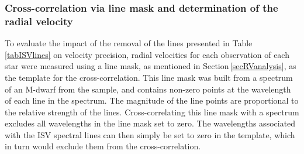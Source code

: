 \subsubsection{Cross-correlation via line mask and determination of the radial velocity}
To evaluate the impact of the removal of the lines presented in Table\,\ref{tabISVlines} on velocity precision, radial velocities for each observation of each star were measured using a line mask, as mentioned in Section\,\ref{secRVanalysis}, as the template for the cross-correlation. This line mask was built from a spectrum of an M-dwarf from the sample, and contains non-zero points at the wavelength of each line in the spectrum. The magnitude of the line points are proportional to the relative strength of the lines. Cross-correlating this line mask with a spectrum excludes all wavelengths in the line mask set to zero. The wavelengths associated with the ISV spectral lines can then simply be set to zero in the template, which in turn would exclude them from the cross-correlation.\\ 

